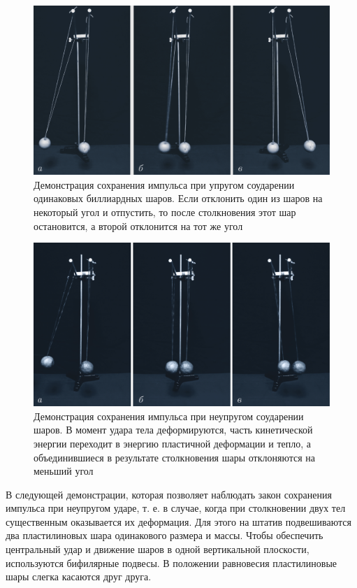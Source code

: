\documentclass[14pt,a4paper,oneside]{extarticle}	%
\begin{document}
	\begin{figure}[H]
			\centering	
			\includegraphics[width=0.9\linewidth]{hit-2.png}
			\caption{Демонстрация сохранения импульса при упругом соударении одинаковых биллиардных шаров. Если отклонить один из шаров на некоторый угол и отпустить, то после столкновения этот шар остановится, а второй отклонится на тот же угол}
			\label{hit-2}
		\end{figure}

	\begin{figure}[H]
	\centering	
	\includegraphics[width=0.9\linewidth]{hit-3.png}
	\caption{Демонстрация сохранения импульса при неупругом соударении шаров. В момент удара тела деформируются, часть кинетической энергии переходит в энергию пластичной деформации и тепло, а объединившиеся в результате столкновения шары отклоняются на меньший угол}
	\label{hit-3}
\end{figure}

В следующей демонстрации, которая позволяет наблюдать закон сохранения импульса при неупругом ударе, т. е. в случае, когда при столкновении двух тел существенным оказывается их деформация. Для этого на штатив подвешиваются два пластилиновых шара одинакового размера и массы. Чтобы обеспечить центральный удар и движение шаров в одной вертикальной плоскости, используются бифилярные подвесы.
В положении равновесия пластилиновые шары слегка касаются друг друга.
\end{document}
